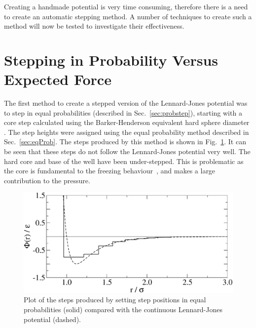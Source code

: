 \documentclass[12pt]{UoAthesis} \usepackage{booktabs}
\begin{document}
Creating a handmade potential is very time consuming, therefore there
is a need to create an automatic stepping method.  A number of
techniques to create such a method will now be tested to investigate
their effectiveness.

\section{Stepping in Probability Versus Expected Force}

The first method to create a stepped version of the Lennard-Jones
potential was to step in equal probabilities (described in
Sec.~\ref{sec:probstep}), starting with a core step calculated using
the Barker-Henderson equivalent hard sphere diameter . The step
heights were assigned using the equal probability method described in
Sec.~\ref{sec:eqProb}.  The steps produced by this method is shown
in Fig.~\ref{fig:probStepping}.  It can be seen that these steps do not
follow the Lennard-Jones potential very well.  The hard core and base
of the well have been under-stepped.  This is problematic as the core
is fundamental to the freezing behaviour~\cite{Alder1957}, and makes a
large contribution to the pressure.  

\begin{figure}[htp] 
  \begin{center}
    \includegraphics[clip,scale=0.45]{figures/probSteps} 
    \caption[Steps produced using equal probabilities compared with
    continuous potential]
    {Plot of the steps produced by setting step positions in equal
      probabilities (solid) compared with the continuous Lennard-Jones
      potential (dashed).}
    \label{fig:probStepping}
  \end{center}
\end{figure}
\end{document}
